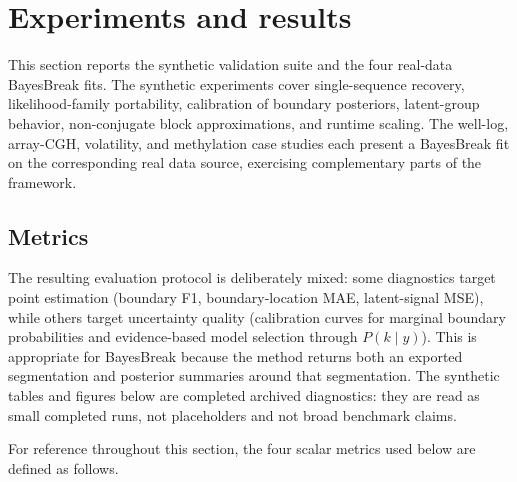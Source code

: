 \section{Experiments and results}
\label{sec:experiments}

This section reports the synthetic validation suite and the four real-data BayesBreak fits.
The synthetic experiments cover single-sequence recovery, likelihood-family portability,
calibration of boundary posteriors, latent-group behavior, non-conjugate block approximations,
and runtime scaling. The well-log, array-CGH, volatility, and methylation case studies each
present a BayesBreak fit on the corresponding real data source, exercising complementary parts
of the framework.

\subsection{Metrics}
\label{sec:metrics}

\begin{table}[H]
    \centering
    
    \caption{Metrics used in the synthetic experiments. When ground-truth boundaries are available, boundary-level metrics use a small tolerance window (here $\tau=2$ indices) so that near-misses are not counted as complete failures. This is a protocol-definition table; no source CSV is associated with it.}
    \label{tab:metrics}
\end{table}

The resulting evaluation protocol is deliberately mixed: some diagnostics target point estimation
(boundary F1, boundary-location MAE, latent-signal MSE), while others target uncertainty quality
(calibration curves for marginal boundary probabilities and evidence-based model selection through
$P(k\mid y)$). This is appropriate for BayesBreak because the method returns both an
exported segmentation and posterior summaries around that segmentation. The synthetic tables and figures below are completed archived diagnostics: they are read as small completed runs, not placeholders and not broad benchmark claims.

For reference throughout this section, the four scalar metrics used below are defined as follows.

